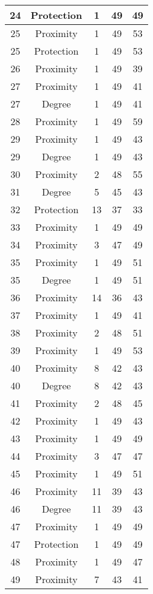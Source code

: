 \documentclass[results.tex]{subfiles}
\begin{document}
\begin{center}
\begin{tabular}{| c || c | c | c | c |}
    \hline
    24 & Protection & 1 & 49 & 49 \\ 
    \hline
    25 & Proximity & 1 & 49 & 53 \\ 
    \hline
    25 & Protection & 1 & 49 & 53 \\ 
    \hline
    26 & Proximity & 1 & 49 & 39 \\ 
    \hline
    27 & Proximity & 1 & 49 & 41 \\ 
    \hline
    27 & Degree & 1 & 49 & 41 \\ 
    \hline
    28 & Proximity & 1 & 49 & 59 \\ 
    \hline
    29 & Proximity & 1 & 49 & 43 \\ 
    \hline
    29 & Degree & 1 & 49 & 43 \\ 
    \hline
    30 & Proximity & 2 & 48 & 55 \\ 
    \hline
    31 & Degree & 5 & 45 & 43 \\ 
    \hline
    32 & Protection & 13 & 37 & 33 \\ 
    \hline
    33 & Proximity & 1 & 49 & 49 \\ 
    \hline
    34 & Proximity & 3 & 47 & 49 \\ 
    \hline
    35 & Proximity & 1 & 49 & 51 \\ 
    \hline
    35 & Degree & 1 & 49 & 51 \\ 
    \hline
    36 & Proximity & 14 & 36 & 43 \\ 
    \hline
    37 & Proximity & 1 & 49 & 41 \\ 
    \hline
    38 & Proximity & 2 & 48 & 51 \\ 
    \hline
    39 & Proximity & 1 & 49 & 53 \\ 
    \hline
    40 & Proximity & 8 & 42 & 43 \\ 
    \hline
    40 & Degree & 8 & 42 & 43 \\ 
    \hline
    41 & Proximity & 2 & 48 & 45 \\ 
    \hline
    42 & Proximity & 1 & 49 & 43 \\ 
    \hline
    43 & Proximity & 1 & 49 & 49 \\ 
    \hline
    44 & Proximity & 3 & 47 & 47 \\ 
    \hline
    45 & Proximity & 1 & 49 & 51 \\ 
    \hline
    46 & Proximity & 11 & 39 & 43 \\ 
    \hline
    46 & Degree & 11 & 39 & 43 \\ 
    \hline
    47 & Proximity & 1 & 49 & 49 \\ 
    \hline
    47 & Protection & 1 & 49 & 49 \\ 
    \hline
    48 & Proximity & 1 & 49 & 47 \\ 
    \hline
    49 & Proximity & 7 & 43 & 41 \\ 
    \hline   \end{tabular}
\end{center}
\end{document}

